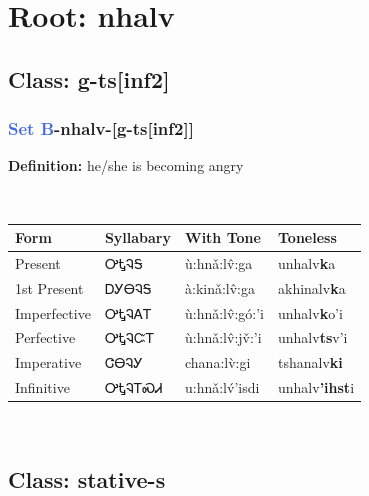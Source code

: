 \needspace{4in}
\section*{Root: nhalv}
\nopagebreak
{}
\needspace{3in}
\subsection*{Class: g-ts[inf2]}
\nopagebreak
\needspace{2in}
\subsubsection*{\textcolor{RoyalBlue}{Set B}{-}\textbf{nhalv}{-}[g-ts[inf2]]}
\nopagebreak
\textbf{Definition: } he/she is becoming angry
\\[0.5em]
\begin{tabularx}{\textwidth}{l X X X}%
\toprule%
\textbf{Form}&\textbf{Syllabary}&\textbf{With Tone}&\textbf{Toneless}\\%
\midrule%
Present&ᎤᎿᎸᎦ&ù:hnǎ:lv̂:ga&unhalv\textbf{k}a\\%
1st Present&ᎠᎩᎾᎸᎦ&à:kinǎ:lv̂:ga&akhinalv\textbf{k}a\\%
Imperfective&ᎤᎿᎸᎪᎢ&ù:hnǎ:lv̂:gó:’i&unhalv\textbf{k}o'i\\%
Perfective&ᎤᎿᎸᏨᎢ&ù:hnǎ:lv̂:jv̌:’i&unhalv\textbf{ts}v'i\\%
Imperative&ᏣᎾᎸᎩ&chana:lv̀:gi&tshanalv\textbf{ki}\\%
Infinitive&ᎤᎿᎸᎢᏍᏗ&u:hnǎ:lv́’isdi&unhalv\textbf{'ihst}i\\%
\bottomrule%
\end{tabularx}
\\[1em]
\needspace{3in}
\subsection*{Class: stative-s}
\nopagebreak
\needspace{2in}

